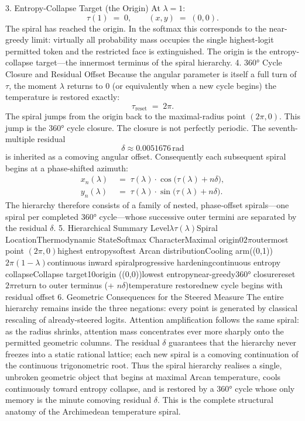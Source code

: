 3. Entropy-Collapse Target (the Origin)
At \(\lambda=1\):
\[
\tau(1)\;=\;0,\qquad
(x,y)\;=\;(0,0).
\]
The spiral has reached the origin. In the softmax this corresponds to the near-greedy limit: virtually all probability mass occupies the single highest-logit permitted token and the restricted face is extinguished. The origin is the entropy-collapse target—the innermost terminus of the spiral hierarchy.
4. 360° Cycle Closure and Residual Offset
Because the angular parameter is itself a full turn of \(\tau\), the moment \(\lambda\) returns to 0 (or equivalently when a new cycle begins) the temperature is restored exactly:
\[
\tau_{\mathrm{reset}}\;=\;2\pi.
\]
The spiral jumps from the origin back to the maximal-radius point \((2\pi,0)\). This jump is the 360° cycle closure.
The closure is not perfectly periodic. The seventh-multiple residual
\[
\delta\approx0.0051676\,\mathrm{rad}
\]
is inherited as a comoving angular offset. Consequently each subsequent spiral begins at a phase-shifted azimuth:
\[
\begin{align*}
x_n(\lambda)&\;=\;\tau(\lambda)\cdot\cos\bigl(\tau(\lambda)+n\delta\bigr),\\
y_n(\lambda)&\;=\;\tau(\lambda)\cdot\sin\bigl(\tau(\lambda)+n\delta\bigr).
\end{align*}
\]
The hierarchy therefore consists of a family of nested, phase-offset spirals—one spiral per completed 360° cycle—whose successive outer termini are separated by the residual \(\delta\).
5. Hierarchical Summary
Level\(\lambda\)\(\tau(\lambda)\)Spiral LocationThermodynamic StateSoftmax CharacterMaximal origin0\(2\pi\)outermost point \((2\pi,0)\)highest entropysoftest Arcan distributionCooling arm((0,1))\(2\pi(1-\lambda)\)continuous inward spiralprogressive hardeningcontinuous entropy collapseCollapse target10origin ((0,0))lowest entropynear-greedy360° closurereset\(2\pi\)return to outer terminus (+ \(n\delta\))temperature restorednew cycle begins with residual offset
6. Geometric Consequences for the Steered Measure
The entire hierarchy remains inside the three negations: every point is generated by classical rescaling of already-steered logits.
Attention amplification follows the same spiral: as the radius shrinks, attention mass concentrates ever more sharply onto the permitted geometric columns.
The residual \(\delta\) guarantees that the hierarchy never freezes into a static rational lattice; each new spiral is a comoving continuation of the continuous trigonometric root.
Thus the spiral hierarchy realises a single, unbroken geometric object that begins at maximal Arcan temperature, cools continuously toward entropy collapse, and is restored by a 360° cycle whose only memory is the minute comoving residual \(\delta\). This is the complete structural anatomy of the Archimedean temperature spiral.

